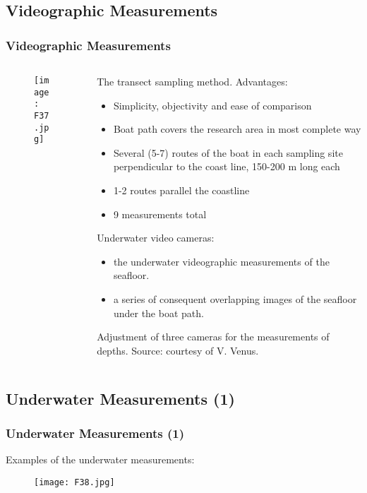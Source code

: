 \documentclass[pdflatex,compress]{beamer}
\begin{document}
\subsection{Videographic Measurements}
\begin{frame}\frametitle{Videographic Measurements}
\begin{minipage}[0.4\textheight]{\textwidth}
\begin{columns}[T]
\begin{column}{0.4\textwidth}
\begin{figure}[H]
	\centering
		\texttt{[image: F37.jpg]}
\end{figure}
\end{column}
\begin{column}{0.6\textwidth}
\scriptsize{The transect sampling method.
Advantages:
\begin{itemize}
	\item Simplicity, objectivity and ease of comparison
	\item Boat path covers the research area in most complete way
	\item Several (5-7) routes of the boat in each sampling site perpendicular to the coast line, 150-200 m long each
	\item 1-2 routes parallel the coastline
	\item 9 measurements total
\end{itemize}
Underwater video cameras:
\begin{itemize}
	\item the underwater videographic measurements of the seafloor.
	\item a series of consequent overlapping images of the seafloor under the boat path.
\end{itemize}
Adjustment of three cameras for the measurements of depths. Source: courtesy of V. Venus.}
\end{column}
\end{columns}
\end{minipage}
\end{frame}

\subsection{Underwater Measurements (1)}
\begin{frame}\frametitle{Underwater Measurements (1)}
Examples of the underwater measurements:
\begin{figure}[H]
	\centering
		\texttt{[image: F38.jpg]}
\end{figure}
\end{frame}
\end{document}
